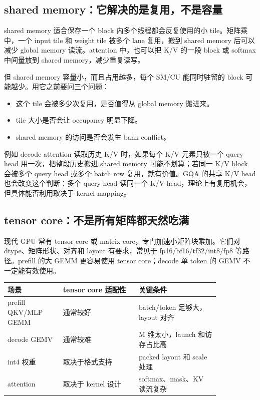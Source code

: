 \subsection{shared memory：它解决的是复用，不是容量}

shared memory 适合保存一个 block 内多个线程都会反复使用的小 tile。矩阵乘中，一个 input tile 和 weight tile 被多个 lane 复用，搬到 shared memory 后可以减少 global memory 读流。attention 中，也可以把 K/V 的一段 block 或 softmax 中间量放到 shared memory，减少重复读写。

但 shared memory 容量小，而且占用越多，每个 SM/CU 能同时驻留的 block 可能越少。用它之前要问三个问题：

\begin{itemize}
  \item 这个 tile 会被多少次复用，是否值得从 global memory 搬进来。
  \item tile 大小是否会让 occupancy 明显下降。
  \item shared memory 的访问是否会发生 bank conflict。
\end{itemize}

例如 decode attention 读取历史 K/V 时，如果每个 K/V 元素只被一个 query head 用一次，把整段历史搬进 shared memory 可能不划算；若同一 K/V block 会被多个 query head 或多个 batch row 复用，就有价值。GQA 的共享 K/V head 也会改变这个判断：多个 query head 读同一个 K/V head，理论上有复用机会，但具体能否利用取决于 kernel mapping。

\subsection{tensor core：不是所有矩阵都天然吃满}

现代 GPU 常有 tensor core 或 matrix core，专门加速小矩阵块乘加。它们对 dtype、矩阵形状、对齐和 layout 有要求，常见于 fp16/bf16/tf32/int8/fp8 等路径。prefill 的大 GEMM 更容易使用 tensor core；decode 单 token 的 GEMV 不一定能有效使用。

\begin{center}
\begin{tabular}{p{0.22\linewidth}p{0.30\linewidth}p{0.32\linewidth}}
\toprule
场景 & tensor core 适配性 & 关键条件 \\
\midrule
prefill QKV/MLP GEMM & 通常较好 & batch/token 足够大，layout 对齐 \\
decode GEMV & 通常较难 & M 维太小，launch 和访存占比高 \\
int4 权重 & 取决于格式支持 & packed layout 和 scale 处理 \\
attention & 取决于 kernel 设计 & softmax、mask、KV 读流复杂 \\
\bottomrule
\end{tabular}
\end{center}

